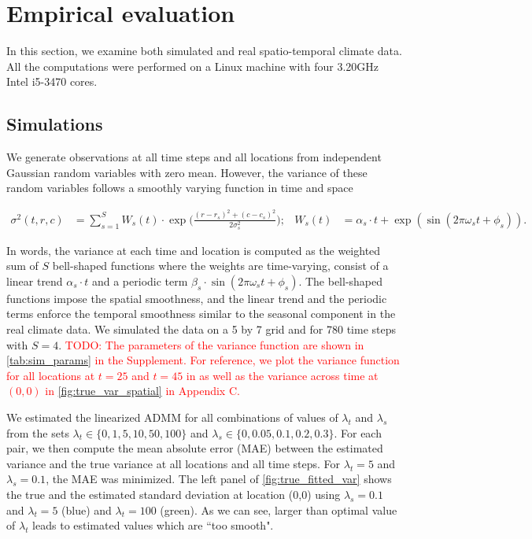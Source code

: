 \documentclass{article}
\newcommand{\attn}[1]{\textcolor{red}{TODO: #1}}
\begin{document}
\section{Empirical evaluation}
\label{sec:empirical-evaluation}

In this section, we examine both simulated and real spatio-temporal
climate data. All the computations were performed on a Linux machine
with four 3.20GHz Intel i5-3470 cores. 

\subsection{Simulations}
\label{sec:simulations}

We generate observations at all time steps and all locations from
independent Gaussian random variables with zero mean. However, the
variance of these random variables follows a smoothly varying function
in time and space

\begin{align}
\sigma^2(t,r,c) & =\sum_{s=1}^{S} W_s(t) \cdot \exp\bigg( \frac{(r-r_s)^2+(c-c_s)^2}{2\sigma_s^2} \bigg); &
W_s(t) & =\alpha_s \cdot t + \exp(\sin(2\pi\omega_s t+\phi_s)) .
\label{eq:sourceVar}
\end{align}

In words, the variance at each time and location is computed as the
weighted sum of $S$ bell-shaped functions where the weights are
time-varying, consist of a linear trend $\alpha_s \cdot t$ and a
periodic term $\beta_s \cdot \sin(2\pi\omega_s t+\phi_s)$. The
bell-shaped functions impose the spatial smoothness, and the linear
trend and the periodic terms enforce the temporal smoothness similar
to the seasonal component in the real climate data. We simulated the
data on a 5 by 7 grid and for 780 time steps with $S=4$. 
\attn{The
parameters of the variance function are shown in
\autoref{tab:sim_params} in the Supplement. For reference, we plot the
variance function for all locations at $t=25$ and $t=45$ in as well as
the variance across time at $(0,0)$ in \autoref{fig:true_var_spatial}
in Appendix C.}

We estimated the linearized ADMM for all combinations of values of
$\lambda_t$ and $\lambda_s$ from the sets $\lambda_t \in
\{0,1,5,10,50,100\}$ and $\lambda_s \in \{0,0.05,0.1,0.2,0.3\}$. For
each pair, we then compute the mean absolute error (MAE) between the
estimated variance and the true variance at all locations and all time
steps. For $\lambda_t=5$ and $\lambda_s=0.1$, the MAE was minimized. The
left panel of \autoref{fig:true_fitted_var} shows the true and the
estimated standard deviation at location (0,0) using $\lambda_s=0.1$
and $\lambda_t=5$ (blue) and $\lambda_t=100$ (green). As we can see,
larger than optimal value of $\lambda_t$ leads to estimated values
which are ``too smooth".  
\end{document}
